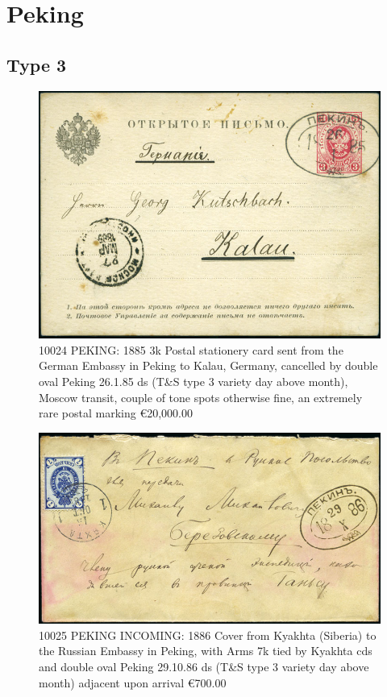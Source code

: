 \chapter{Peking}
\section{Type 3}
\begin{figure}[htbp]
\centering
\includegraphics[width=.95\textwidth]{../russian-post-offices-in-china/10024.jpg}
\caption{
10024 PEKING: 1885 3k Postal stationery card sent from the German Embassy in 
Peking to Kalau, Germany, cancelled by double oval Peking 26.1.85 ds 
(T\&S type 3 variety day above month), Moscow transit, couple of tone 
spots otherwise fine, an extremely rare postal marking
\euro 20,000.00 
}  
\end{figure}

\begin{figure}[htbp]
\centering
\includegraphics[width=.95\textwidth]{../russian-post-offices-in-china/10025.jpg}
\caption{
10025	PEKING INCOMING: 1886 Cover from Kyakhta (Siberia) to
the Russian Embassy in Peking, with Arms 7k tied by Kyakhta cds and double
oval Peking 29.10.86 ds (T\&S type 3 variety day above month) adjacent upon arrival
\euro 700.00
}  
\end{figure}
                                                                                      